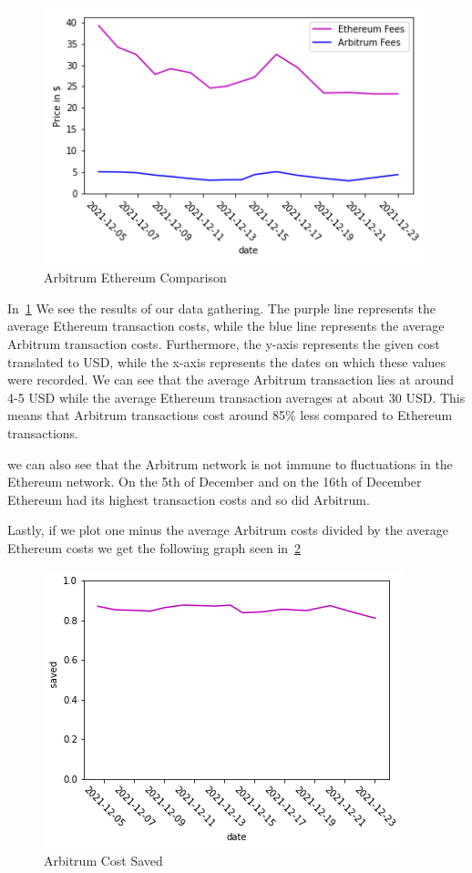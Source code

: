 \documentclass[a4paper,oneside,openright,11pt]{report}
\begin{document}
	\begin{figure}[h]
		\centering
		\includegraphics[scale=0.8]{./Pictures/arb_eth_fees1.png}
		\caption{Arbitrum Ethereum Comparison}
		\label{fig:Arbitrum_Ethereum_Fees}
	\end{figure}
	
	In~\cref{fig:Arbitrum_Ethereum_Fees} We see the results of our data gathering. The purple line
	represents the average Ethereum transaction costs, while the blue line represents the average
	Arbitrum transaction costs. Furthermore, the y-axis represents the given cost translated to USD,
	while the x-axis represents the dates on which these values were recorded.
	We can see that the average Arbitrum transaction lies at around 4-5 USD while the average
	Ethereum transaction averages at about 30 USD. This means that Arbitrum transactions cost
	around 85\% less compared to Ethereum transactions.
	
	we can also see that the Arbitrum network is not immune to fluctuations in the Ethereum network.
	On the 5th of December and on the 16th of December Ethereum had its highest transaction costs
	and so did Arbitrum.
	
	\clearpage
	Lastly, if we plot one minus the average Arbitrum costs divided by the average Ethereum costs we get 
	the following graph seen in~\cref{fig:Arbitrum_Ethereum_Save}
	
	\begin{figure}[h]
		\centering
		\includegraphics[scale=0.8]{./Pictures/arb_eth_save1.png}
		\caption{Arbitrum Cost Saved}
		\label{fig:Arbitrum_Ethereum_Save}
	\end{figure}
	
\end{document}
